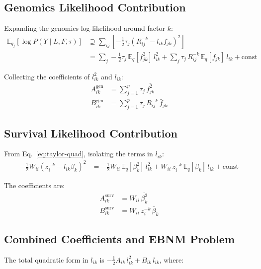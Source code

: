 \documentclass[11pt]{article}
\newcommand{\fbar}[2]{\bar{f}_{#1#2}}
\newcommand{\betabar}[1]{\bar{\beta}_{#1}}
\newcommand{\fsec}[2]{\overline{f^2_{#1#2}}}
\newcommand{\betasec}[1]{\overline{\beta^2_{#1}}}
\begin{document}
\subsection{Genomics Likelihood Contribution}

Expanding the genomics log-likelihood around factor $k$:
\begin{align}
  \mathbb{E}_{q_f}\!\left[\log P(Y \mid L, F, \tau)\right]
  &\supseteq \sum_{ij} \left[-\frac{1}{2}\tau_{j}
     \left(R^{-k}_{ij} - l_{ik}f_{jk}\right)^{2}\right] \\
  &= \sum_j -\frac{1}{2}\tau_j\,\mathbb{E}_q[f_{jk}^2]\,l_{ik}^2
     + \sum_j \tau_j\,R^{-k}_{ij}\,\mathbb{E}_q[f_{jk}]\,l_{ik}
     + \text{const}
\end{align}

Collecting the coefficients of $l_{ik}^2$ and $l_{ik}$:
\begin{align}
  A^{\text{gen}}_{ik} &= \sum_{j=1}^p \tau_j\,\fsec{j}{k}
  \label{eq:A-gen}\\
  B^{\text{gen}}_{ik} &= \sum_{j=1}^p \tau_j\,R^{-k}_{ij}\,\fbar{j}{k}
  \label{eq:B-gen}
\end{align}

\subsection{Survival Likelihood Contribution}

From Eq.~\eqref{eq:taylor-quad}, isolating the terms in $l_{ik}$:
\begin{align}
  -\frac{1}{2}W_{ii}\!\left(z^{-k}_i - l_{ik}\beta_k\right)^{2}
  &= -\frac{1}{2}W_{ii}\,\mathbb{E}_q[\beta_k^2]\,l_{ik}^2
     + W_{ii}\,z^{-k}_i\,\mathbb{E}_q[\beta_k]\,l_{ik}
     + \text{const}
\end{align}

The coefficients are:
\begin{align}
  A^{\text{surv}}_{ik} &= W_{ii}\,\betasec{k}
  \label{eq:A-surv} \\
  B^{\text{surv}}_{ik} &= W_{ii}\,z^{-k}_i\,\betabar{k}
  \label{eq:B-surv}
\end{align}

\subsection{Combined Coefficients and EBNM Problem}

The total quadratic form in $l_{ik}$ is
$-\tfrac{1}{2}A_{ik}\,l_{ik}^2 + B_{ik}\,l_{ik}$, where:
\end{document}

